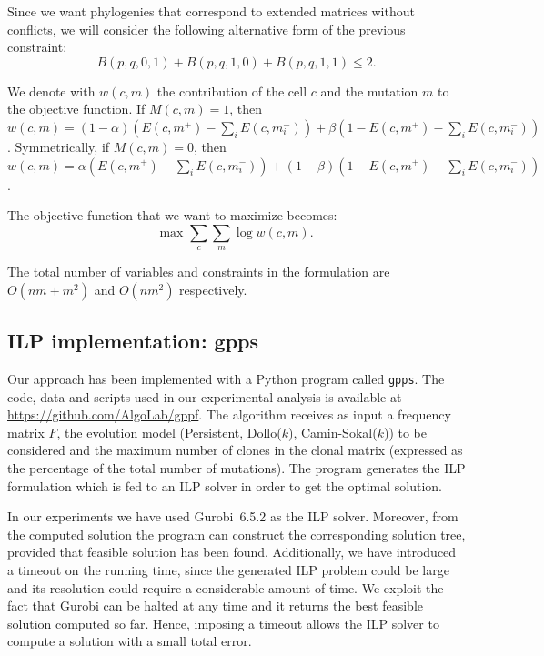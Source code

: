 \documentclass[a4paper,USenglish]{article}
\theoremstyle{definition}
\begin{document}
Since we want phylogenies that correspond to extended matrices without conflicts,
we  will  consider  the   following  alternative  form  of  the  previous
constraint: 
\begin{equation}\label{eq:C=0}
   B(p,q,0,1) + B(p,q,1,0) + B(p,q,1,1)\le 2.  
\end{equation}

We denote with $w(c,m)$ the contribution of the cell $c$ and the mutation $m$ to the
objective function.
If $M(c,m)=1$, then $w(c,m) = \left(1 - \alpha\right) \left( E(c,m^{+}) - \sum_{i} E(c, m_{i}^{-}) \right)
+  \beta \left( 1 - E(c,m^{+}) - \sum_{i} E(c, m_{i}^{-}) \right)$.
Symmetrically, if  $M(c,m)=0$, then $w(c,m) = \alpha \left( E(c,m^{+}) - \sum_{i} E(c, m_{i}^{-}) \right)
+  \left(1 - \beta\right) \left( 1 - E(c,m^{+}) - \sum_{i} E(c, m_{i}^{-}) \right)$.


The objective function that we want to maximize becomes:
\begin{equation}
\label{eq:log-likelihood-goal}
    \mbox{max } \sum_c \sum_m \log w(c,m).
\end{equation}


The  total  number of  variables  and  constraints  in  the formulation  are
$O(nm+m^2)$ and $O(nm^2)$ respectively.

\subsection{ILP implementation: gpps}

Our approach has been implemented with a  Python program called \texttt{gpps}. 
  The code, data and scripts used in our experimental analysis is 
  available at \url{https://github.com/AlgoLab/gppf}.
The algorithm receives as input  a frequency matrix $F$, the evolution
  model  (Persistent, Dollo($k$),  Camin-Sokal($k$)) to  be considered
  and the maximum number of clones in the clonal matrix (expressed
  as the percentage of the total number of mutations).
The  program generates  the ILP  formulation which  is fed  to an  ILP
  solver in order to get the optimal solution.

In our experiments we have used Gurobi~6.5.2 as the ILP solver. 
Moreover, from  the computed  solution the  program can  construct the
  corresponding  solution tree,  provided that  feasible solution  has
  been found. 
Additionally, we have introduced a timeout on the running time, since the
  generated ILP problem could be large and its resolution could require
  a considerable amount of time.
%
We exploit the fact that Gurobi can be halted at any time and it returns the best
  feasible solution computed so far.
%
Hence, imposing a timeout allows the ILP solver to compute a solution with a small
  total error.
\end{document}
